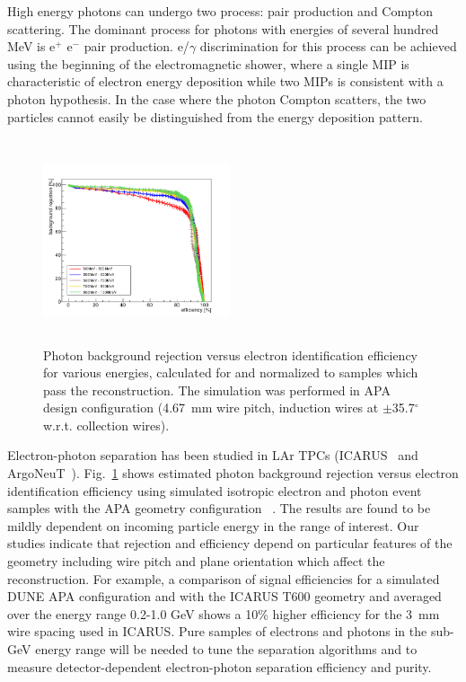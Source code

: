 High energy photons can undergo two process: pair production and Compton scattering. 
The dominant process for photons with energies of several hundred MeV is 
e$^+$ e$^-$ pair production.
e/$\gamma$ discrimination
for this process can be achieved using the beginning of the electromagnetic shower, where 
a single MIP is characteristic of electron energy deposition while two MIPs is consistent 
with a photon hypothesis.
In the case where the photon Compton scatters, the two particles cannot easily be distinguished
from the energy deposition pattern.


\begin{figure}[h!]
  \centering
\includegraphics[width=0.49\textwidth,height=6.0cm]{figures/eff-bgdrej-diffen}
  \caption{
 Photon background rejection versus electron identification efficiency for various energies, calculated for and normalized to samples which pass the reconstruction. 
The simulation was performed in APA design configuration (4.67~mm wire pitch, induction wires at $\pm$35.7$^{\circ}$ w.r.t. collection wires). 
}
\label{fig:egam}
\end{figure}
Electron-photon separation has been studied in LAr TPCs
(ICARUS~\cite{icarus_eg} and ArgoNeuT~\cite{argoneut_eg}).
Fig.~\ref{fig:egam} 
 shows estimated photon background rejection versus electron identification efficiency using 
simulated isotropic electron and photon event samples  with the 
APA geometry configuration ~\cite{dunecdr}.
The results are found to be mildly dependent
on incoming particle energy in the range of interest. 
%
Our studies indicate that rejection and efficiency depend 
on particular features of the geometry including wire pitch and plane 
orientation which affect the reconstruction. 
For example, a comparison of signal efficiencies for a simulated 
DUNE APA configuration and with the ICARUS T600 geometry
and averaged over the energy range 0.2-1.0 GeV shows 
a 10\% higher efficiency for the 3~mm wire spacing used in ICARUS.
%
Pure samples of electrons and photons in the sub-GeV energy range will be
needed to tune the separation algorithms and to measure 
detector-dependent electron-photon separation efficiency and purity.

